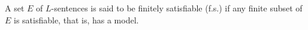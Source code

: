 A set $E$ of $L$-sentences is said to be finitely satisfiable (f.s.) if any finite subset of $E$ is satisfiable, that is, has a model.
